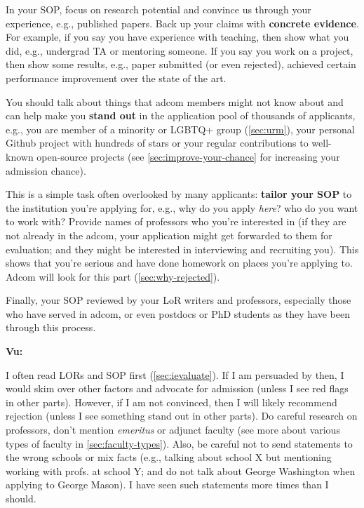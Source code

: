 \documentclass[oneside,11pt,dvipsnames]{book}
\newenvironment{commentbox}[1][]{
  \small
  \begin{mybox}
    {\small \textbf{#1}}
  }{
  \end{mybox}
}
\begin{document}
In your SOP, focus on research potential and convince us through your experience, e.g., published papers. Back up your claims with \textbf{concrete evidence}. For example, if you say you have experience with teaching, then show what you did, e.g., undergrad TA or mentoring someone.  If you say you work on a project, then show some results, e.g., paper submitted (or even rejected), achieved certain performance improvement over the state of the art. 


You should talk about things that adcom members might not know about and can help make you \textbf{stand out} in the application pool of thousands of applicants, e.g., you are member of a minority or LGBTQ+ group (\autoref{sec:urm}), your personal Github project with hundreds of stars or your regular contributions to well-known open-source projects (see \autoref{sec:improve-your-chance} for increasing your admission chance).


This is a simple task often overlooked by many applicants: \textbf{tailor your SOP} to the institution you're applying for,
e.g., why do you apply \emph{here}? who do you want to work with?
Provide names of professors who you're interested in (if they are not already in the adcom, your application might get forwarded to them for evaluation; and they might be interested in interviewing and recruiting you).
This shows that you're serious and have done homework on places you're applying to.
Adcom will look for this part (\autoref{sec:why-rejected}).

Finally, your SOP reviewed by your LoR writers and professors, especially those who have served in adcom, or even postdocs or PhD students as they have been through this process.

\begin{commentbox}[Vu:]
  I often read LORs and SOP first (\autoref{sec:ievaluate}). If I am
  persuaded by then, I would skim over other factors and advocate for
  admission (unless I see red flags in other parts). However, if I am not
  convinced, then I will likely recommend rejection (unless I see
  something stand out in other parts).
  \tcblower
  Do careful research on professors, don't mention \emph{emeritus} or adjunct faculty (see more about various types of faculty in \autoref{sec:faculty-types}).
  Also, be careful not to send statements to the wrong schools or mix
  facts (e.g., talking about school X but mentioning working with
  profs. at school Y; and do not talk about George Washington when applying to George Mason). I have seen such statements more times than I should.
\end{commentbox}
\end{document}
